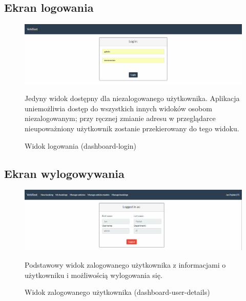 \documentclass[eng,printmode,openany]{mgr}
\begin{document}
\subsection{Ekran logowania}
\begin{figure}[H]
	\centering
	\includegraphics[width=\textwidth]{images/views/dashboard-login.png}
	\caption{Widok logowania (dashboard-login)}
	\small 
	Jedyny widok dostępny dla niezalogowanego użytkownika. Aplikacja uniemożliwia dostęp do wszystkich innych widoków osobom niezalogowanym; przy ręcznej zmianie adresu w przeglądarce nieupoważniony użytkownik zostanie przekierowany do tego widoku.
\end{figure}

\subsection{Ekran wylogowywania}
\begin{figure}[H]
	\centering
	\includegraphics[width=\textwidth]{images/views/dashboard-logout.png}
	\caption{Widok zalogowanego użytkownika (dashboard-user-details)}
	\small 
	Podstawowy widok zalogowanego użytkownika z informacjami o użytkowniku i możliwością wylogowania się.
\end{figure}
\end{document}
